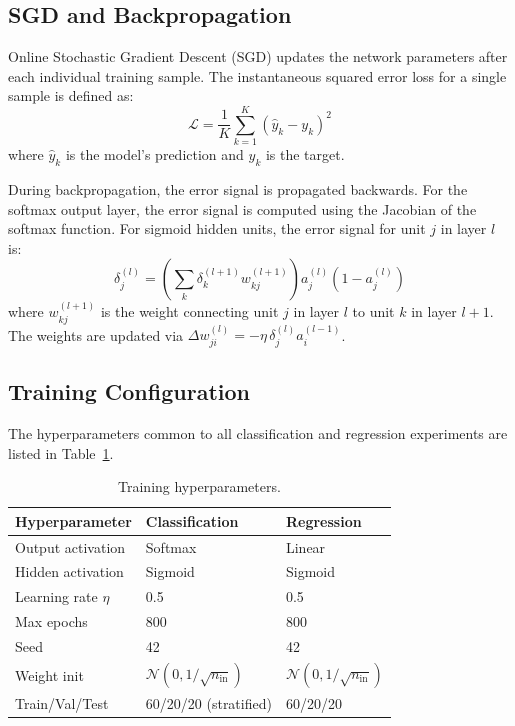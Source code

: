 \documentclass[11pt,a4paper]{article}
\begin{document}
\subsection{SGD and Backpropagation}
Online Stochastic Gradient Descent (SGD) updates the network parameters after each individual training sample. The instantaneous squared error loss for a single sample is defined as:
\begin{equation}
\mathcal{L} = \frac{1}{K}\sum_{k=1}^{K}(\hat{y}_k - y_k)^2
\end{equation}
where $\hat{y}_k$ is the model's prediction and $y_k$ is the target.

During backpropagation, the error signal is propagated backwards. For the softmax output layer, the error signal is computed using the Jacobian of the softmax function. For sigmoid hidden units, the error signal for unit $j$ in layer $l$ is:
\begin{equation}
\delta^{(l)}_j = \left(\sum_k \delta^{(l+1)}_k w^{(l+1)}_{kj}\right) a^{(l)}_j (1 - a^{(l)}_j)
\end{equation}
where $w^{(l+1)}_{kj}$ is the weight connecting unit $j$ in layer $l$ to unit $k$ in layer $l+1$. The weights are updated via $\Delta w^{(l)}_{ji} = -\eta \, \delta^{(l)}_j a^{(l-1)}_i$.

\subsection{Training Configuration}
The hyperparameters common to all classification and regression experiments are listed in Table~\ref{tab:hyperparams}.
\begin{table}[H]
\centering
\caption{Training hyperparameters.}
\label{tab:hyperparams}
\begin{tabular}{lll}
\toprule
Hyperparameter & Classification & Regression \\
\midrule
Output activation & Softmax & Linear \\
Hidden activation & Sigmoid & Sigmoid \\
Learning rate $\eta$ & 0.5 & 0.5 \\
Max epochs & 800 & 800 \\
Seed & 42 & 42 \\
Weight init & $\mathcal{N}(0,1/\sqrt{n_{\text{in}}})$ & $\mathcal{N}(0,1/\sqrt{n_{\text{in}}})$ \\
Train/Val/Test & 60/20/20 (stratified) & 60/20/20 \\
\bottomrule
\end{tabular}
\end{table}
\end{document}
